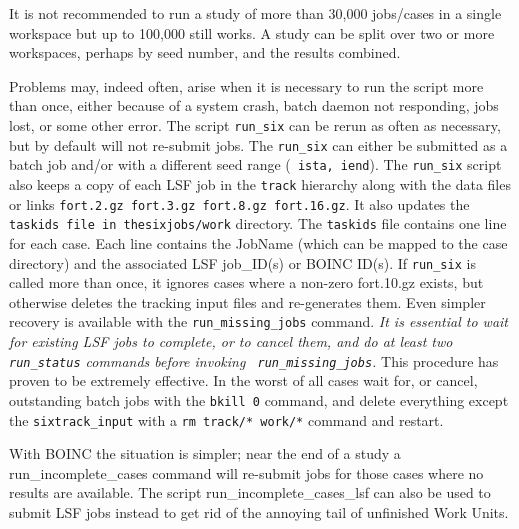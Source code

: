 \documentclass{cernatsnote}
\begin{document}
It is not recommended to run a study of more than 30,000 jobs/cases in a
single workspace but up to 100,000 still works. A study can be split over two
or more workspaces, perhaps by seed number, and the results combined.

Problems may, indeed often, arise when it is necessary to run the script more
than once, either because of a system crash, batch daemon not responding, jobs
lost, or some other error.  The script {\tt run\_six} can be rerun as often as
necessary, but by default will not re-submit jobs. The {\tt run\_six} can
either be submitted as a batch job and/or with a different seed range ({\tt
ista, iend}).  The {\tt run\_six} script also keeps a copy of each LSF job in
the {\tt track} hierarchy along with the data files or links {\tt fort.2.gz
fort.3.gz fort.8.gz fort.16.gz}.  It also updates the {\tt taskids file in
the}{\tt sixjobs/work} directory.  The {\tt taskids} file contains one line for
each case. Each line contains the JobName (which can be mapped to the case
directory) and the associated LSF job\_ID(s) or BOINC ID(s).  If {\tt run\_six}
is called more than once, it ignores cases where a non-zero fort.10.gz exists,
but otherwise deletes the tracking input files and re-generates them. Even
simpler recovery is available with the {\tt run\_missing\_jobs} command.
\emph{It is essential to wait for existing LSF jobs to complete, or to cancel
them, and do at least two {\tt run\_status} commands before invoking {\tt
run\_missing\_jobs}.} This procedure has proven to be extremely effective.  In
the worst of all cases wait for, or cancel, outstanding batch jobs with the
{\tt bkill 0} command, and delete everything except the {\tt sixtrack\_input}
with a {\tt rm track/* work/*} command and restart.  

With BOINC the situation is simpler; near the end of a study a
{run\_incomplete\_cases} command will re-submit jobs for those cases where no
results are available. The script {run\_incomplete\_cases\_lsf} can also be
used to submit LSF jobs instead to get rid of the annoying tail of
unfinished Work Units.
\end{document}

